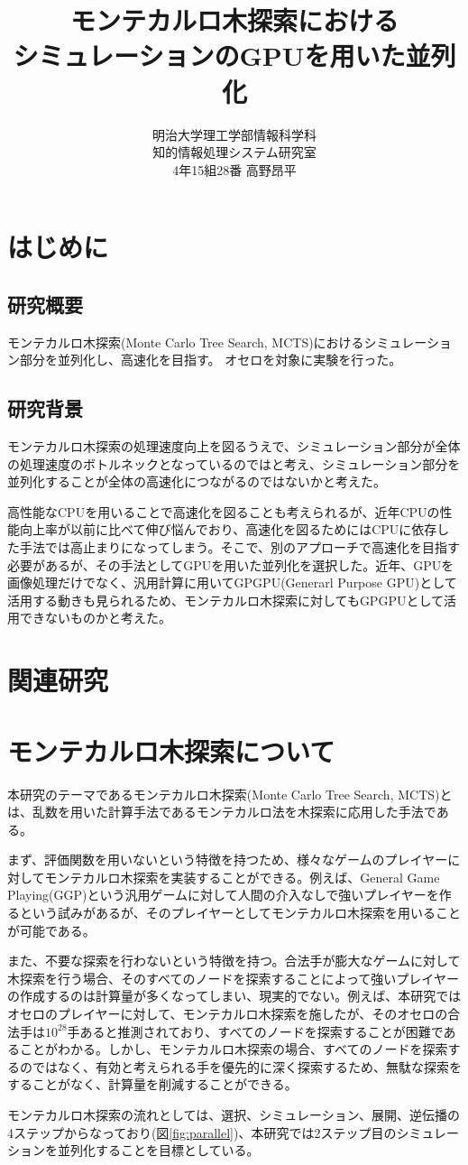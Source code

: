 \documentclass[10pt, a4paper]{jsarticle}
\title{モンテカルロ木探索における\\シミュレーションのGPUを用いた並列化}
\author{明治大学理工学部情報科学科\\知的情報処理システム研究室\\4年15組28番 高野昂平}
\date{}
\begin{document}
\maketitle
\newpage
\section{はじめに}
\subsection{研究概要}
モンテカルロ木探索(Monte Carlo Tree Search, MCTS)におけるシミュレーション部分を並列化し、高速化を目指す。
オセロを対象に実験を行った。
\subsection{研究背景}
モンテカルロ木探索の処理速度向上を図るうえで、シミュレーション部分が全体の処理速度のボトルネックとなっているのではと考え、シミュレーション部分を並列化することが全体の高速化につながるのではないかと考えた。\par
高性能なCPUを用いることで高速化を図ることも考えられるが、近年CPUの性能向上率が以前に比べて伸び悩んでおり、高速化を図るためにはCPUに依存した手法では高止まりになってしまう。そこで、別のアプローチで高速化を目指す必要があるが、その手法としてGPUを用いた並列化を選択した。近年、GPUを画像処理だけでなく、汎用計算に用いてGPGPU(Generarl Purpose GPU)として活用する動きも見られるため、モンテカルロ木探索に対してもGPGPUとして活用できないものかと考えた。
\section{関連研究}
\section{モンテカルロ木探索について}
本研究のテーマであるモンテカルロ木探索(Monte Carlo Tree Search, MCTS)とは、乱数を用いた計算手法であるモンテカルロ法を木探索に応用した手法である。
\par まず、評価関数を用いないという特徴を持つため、様々なゲームのプレイヤーに対してモンテカルロ木探索を実装することができる。例えば、General Game Playing(GGP)という汎用ゲームに対して人間の介入なしで強いプレイヤーを作るという試みがあるが、そのプレイヤーとしてモンテカルロ木探索を用いることが可能である。
\par また、不要な探索を行わないという特徴を持つ。合法手が膨大なゲームに対して木探索を行う場合、そのすべてのノードを探索することによって強いプレイヤーの作成するのは計算量が多くなってしまい、現実的でない。例えば、本研究ではオセロのプレイヤーに対して、モンテカルロ木探索を施したが、そのオセロの合法手は$10^{28}$手あると推測されており、すべてのノードを探索することが困難であることがわかる。しかし、モンテカルロ木探索の場合、すべてのノードを探索するのではなく、有効と考えられる手を優先的に深く探索するため、無駄な探索をすることがなく、計算量を削減することができる。
\par モンテカルロ木探索の流れとしては、選択、シミュレーション、展開、逆伝播の4ステップからなっており(図\ref{fig:parallel})、本研究では2ステップ目のシミュレーションを並列化することを目標としている。
\end{document}
